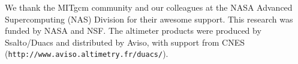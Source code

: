 \documentclass[grl]{agutex2015}
\begin{document}
\begin{article}
%
%




%

\begin{acknowledgments}
We thank the MITgcm community and our colleagues at the NASA Advanced
Supercomputing (NAS) Division for their awesome support.
This research was funded by NASA and NSF.
The altimeter products were produced by Ssalto/Duacs
and distributed by Aviso, with support from CNES (\texttt{http://www.aviso.altimetry.fr/duacs/}).
\end{acknowledgments}



\end{article}
\end{document}
